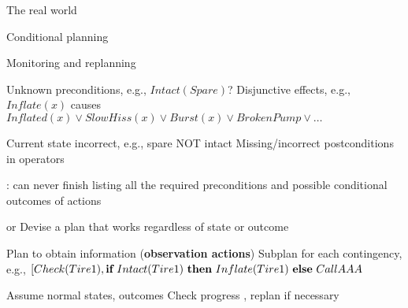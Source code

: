 \documentclass{article}
\newcommand{\condstep}[3]{\mbf{if}~#1~\mbf{then}~#2~\mbf{else}~#3}
\begin{document}
\begin{huge}

\sf


\blob The real world

\blob Conditional planning

\blob Monitoring and replanning



\vspace*{0.2in}

\textwidth
{}

\vspace*{0.4in}

\textwidth
{}




\al
  Unknown preconditions, e.g., $Intact(Spare)$?\al
  Disjunctive effects, e.g., $Inflate(x)$ causes\nl
    $Inflated(x) \lor SlowHiss(x) \lor Burst(x) \lor BrokenPump \lor \ldots$

\al
  Current state incorrect, e.g., spare NOT intact\al
  Missing/incorrect postconditions in operators

:\nl
   can never finish listing all the required preconditions and\nl
   possible conditional outcomes of actions



 or \nl
   Devise a plan that works regardless of state or outcome\\

\nl
    Plan to obtain information ({\bf observation actions})\nl
    Subplan for each contingency, e.g.,\nl
    $[Check(Tire1),\condstep{Intact(Tire1)}{Inflate(Tire1)}{CallAAA}$\\

\nl
    Assume normal states, outcomes\nl
    Check progress , replan if necessary\\


\end{huge}
\end{document}
